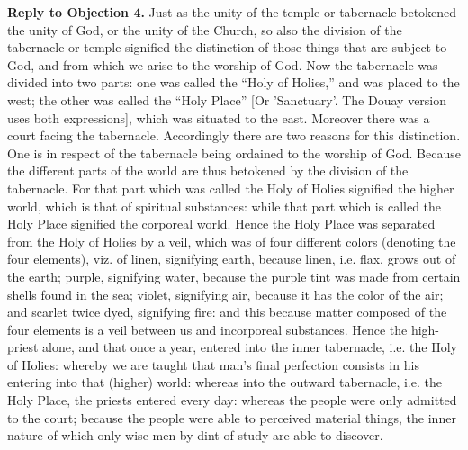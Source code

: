 \textbf{Reply to Objection 4.} Just as the unity of the temple or tabernacle betokened the unity of God, or the unity of the Church, so also the division of the tabernacle or temple signified the distinction of those things that are subject to God, and from which we arise to the worship of God. Now the tabernacle was divided into two parts: one was called the ``Holy of Holies,'' and was placed to the west; the other was called the ``Holy Place'' [Or 'Sanctuary'. The Douay version uses both expressions], which was situated to the east. Moreover there was a court facing the tabernacle. Accordingly there are two reasons for this distinction. One is in respect of the tabernacle being ordained to the worship of God. Because the different parts of the world are thus betokened by the division of the tabernacle. For that part which was called the Holy of Holies signified the higher world, which is that of spiritual substances: while that part which is called the Holy Place signified the corporeal world. Hence the Holy Place was separated from the Holy of Holies by a veil, which was of four different colors (denoting the four elements), viz. of linen, signifying earth, because linen, i.e. flax, grows out of the earth; purple, signifying water, because the purple tint was made from certain shells found in the sea; violet, signifying air, because it has the color of the air; and scarlet twice dyed, signifying fire: and this because matter composed of the four elements is a veil between us and incorporeal substances. Hence the high-priest alone, and that once a year, entered into the inner tabernacle, i.e. the Holy of Holies: whereby we are taught that man's final perfection consists in his entering into that (higher) world: whereas into the outward tabernacle, i.e. the Holy Place, the priests entered every day: whereas the people were only admitted to the court; because the people were able to perceived material things, the inner nature of which only wise men by dint of study are able to discover.

